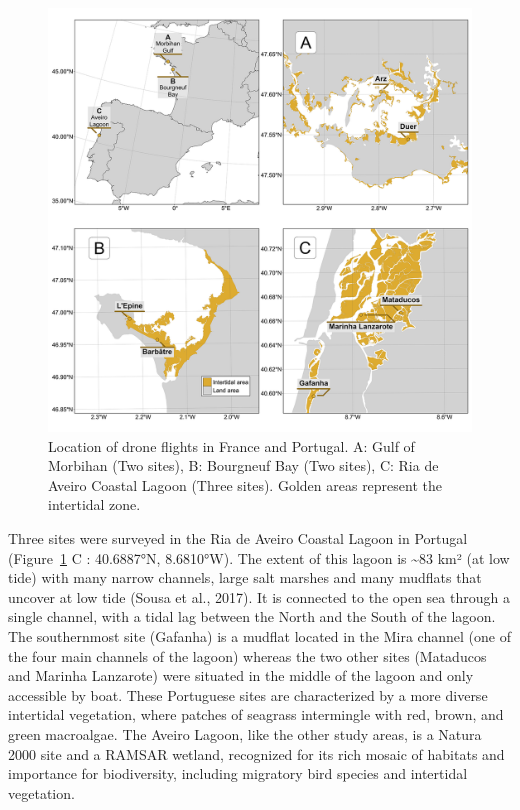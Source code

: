 \documentclass[
  letterpaper,
  11pt,
  english,
  singlespacing,
  headsepline]{MastersDoctoralThesis}
\begin{document}
\begin{spacing}{1.5}
\begin{figure}
{\includegraphics[width=0.95\linewidth,height=\textheight,keepaspectratio]{Chapter3/Figs/Figure1.png}

}

\caption{\label{fig-map}Location of drone flights in France and
Portugal. A: Gulf of Morbihan (Two sites), B: Bourgneuf Bay (Two sites),
C: Ria de Aveiro Coastal Lagoon (Three sites). Golden areas represent
the intertidal zone.}

\end{figure}%

Three sites were surveyed in the Ria de Aveiro Coastal Lagoon in
Portugal (Figure~\ref{fig-map} C : 40.6887°N, 8.6810°W). The extent of
this lagoon is \textasciitilde83 km² (at low tide) with many narrow
channels, large salt marshes and many mudflats that uncover at low tide
(Sousa et al., 2017). It is connected to the open sea through a single
channel, with a tidal lag between the North and the South of the lagoon.
The southernmost site (Gafanha) is a mudflat located in the Mira channel
(one of the four main channels of the lagoon) whereas the two other
sites (Mataducos and Marinha Lanzarote) were situated in the middle of
the lagoon and only accessible by boat. These Portuguese sites are
characterized by a more diverse intertidal vegetation, where patches of
seagrass intermingle with red, brown, and green macroalgae. The Aveiro
Lagoon, like the other study areas, is a Natura 2000 site and a RAMSAR
wetland, recognized for its rich mosaic of habitats and importance for
biodiversity, including migratory bird species and intertidal
vegetation.


\end{spacing}
\end{document}
